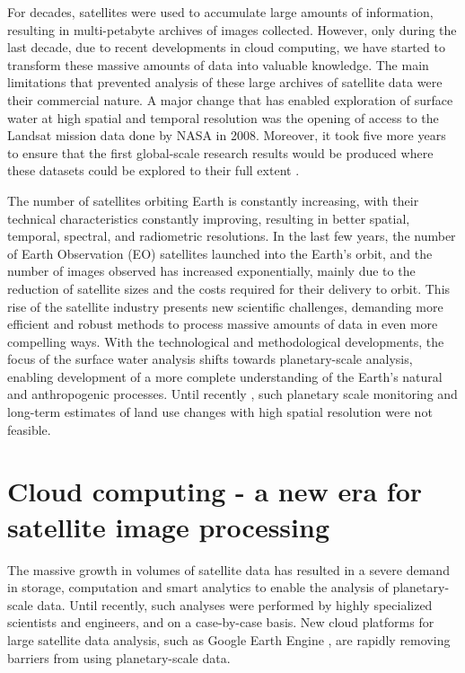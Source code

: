 For decades, satellites were used to accumulate large amounts of information, resulting in multi-petabyte archives of images collected. However, only during the last decade, due to recent developments in cloud computing, we have started to transform these massive amounts of data into valuable knowledge. The main limitations that prevented analysis of these large archives of satellite data were their commercial nature. A major change that has enabled exploration of surface water at high spatial and temporal resolution was the opening of access to the Landsat mission data done by NASA in 2008. Moreover, it took five more years to ensure that the first global-scale research results would be produced where these datasets could be explored to their full extent \citet{Hansen2013}.


The number of satellites orbiting Earth is constantly increasing, with their technical characteristics constantly improving, resulting in better spatial, temporal, spectral, and radiometric resolutions. In the last few years, the number of Earth Observation (EO) satellites launched into the Earth's orbit, and the number of images observed has increased exponentially, mainly due to the reduction of satellite sizes and the costs required for their delivery to orbit. This rise of the satellite industry presents new scientific challenges, demanding more efficient and robust methods to process massive amounts of data in even more compelling ways. With the technological and methodological developments, the focus of the surface water analysis shifts towards planetary-scale analysis, enabling development of a more complete understanding of the Earth's natural and anthropogenic processes. Until recently \citet{Hansen2013, pekel2016high}, such planetary scale monitoring and long-term estimates of land use changes with high spatial resolution were not feasible.

\section{Cloud computing - a new era for satellite image processing}

The massive growth in volumes of satellite data has resulted in a severe demand in storage, computation and smart analytics to enable the analysis of planetary-scale data. Until recently, such analyses were performed by highly specialized scientists and engineers, and on a case-by-case basis. New cloud platforms for large satellite data analysis, such as Google Earth Engine \citet{Gorelick2012}, are rapidly removing barriers from using planetary-scale data. 

